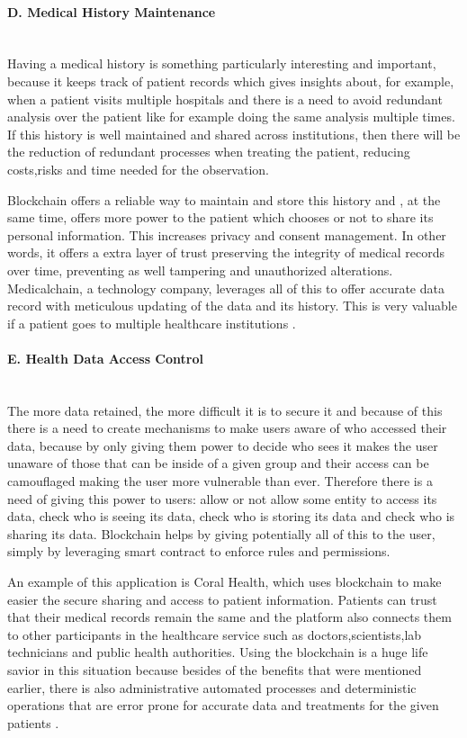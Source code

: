 \paragraph{D. Medical History Maintenance} \mbox{}\\
Having a medical history is something particularly interesting and important, because it keeps track 
of patient records which gives insights about, for example, when a patient visits multiple hospitals and there is a need to avoid 
redundant analysis over the patient like for example doing the same analysis multiple times. If this history is well maintained and 
shared across institutions, then there will be the reduction of redundant processes when treating the patient, reducing costs,risks and
time needed for the observation.

Blockchain offers a reliable way to maintain and store this history and , at the same time, offers more power to the patient which chooses or 
not to share its personal information. This increases privacy and consent management. In other words, it offers a extra layer of trust 
preserving the integrity of medical records over time, preventing as well tampering and unauthorized alterations.
Medicalchain, a technology company, leverages all of this to offer accurate data record with meticulous updating of the data and its 
history. This is very valuable if a patient goes to multiple healthcare institutions \cite{medicalchain}.

\paragraph{E. Health Data Access Control} \mbox{}\\
The more data retained, the more difficult it is to secure it and because of this there is a need to create mechanisms to make users 
aware of who accessed their data, because by only giving them power to decide who sees it makes the user unaware of those that can be inside 
of a given group and their access can be camouflaged making the user more vulnerable than ever. Therefore there is a 
need of giving this power to users: allow or not allow some entity to access its data, check who is seeing its data, check who is storing 
its data and check who is sharing its data. Blockchain helps by giving potentially all of this to the user, simply by leveraging smart 
contract to enforce rules and permissions.

An example of this application is Coral Health, which uses blockchain to make easier the secure sharing and access to patient information. 
Patients can trust that their medical records remain the same and the platform also connects them to other participants in the healthcare 
service such as doctors,scientists,lab technicians and public health authorities. Using the blockchain is a huge life savior in this 
situation because besides of the benefits that were mentioned earlier, there is also administrative automated processes and deterministic 
operations that are error prone for accurate data and treatments for the given patients \cite{coral-health}.

